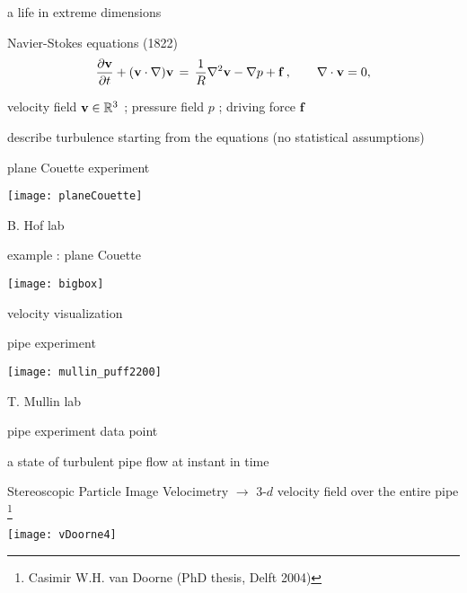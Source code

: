 \begin{frame}{a life in extreme dimensions}
\begin{block}{Navier-Stokes equations (1822)}
\[
\dfrac{\partial {\bf v}}{\partial t} + ({\bf v} \cdot \nabla) {\bf v}
	\,=\,
\frac{1}{R} \nabla ^2 {\bf v}
-\nabla p
+ \mathbf{f}
    \,,\qquad
\nabla \cdot {\bf v} = 0,
\]
\end{block}

\hfill{\small
velocity field  ${\bf v} \in \mathbb{R}^3$
;
pressure field $p$
;
driving force $\mathbf{f}$
        }

\medskip

\begin{block}{describe turbulence}
starting from the equations (no statistical assumptions)
\end{block}

\bigskip

\hfill {\Large\textcolor{red}{}}

\end{frame}

\begin{frame}{plane Couette experiment}
\begin{center}
\texttt{[image: planeCouette]}
\end{center}
B. Hof lab
\end{frame}

\begin{frame}{example : plane Couette}
\begin{center}
\texttt{[image: bigbox]}
\end{center}
velocity visualization
\end{frame}

\begin{frame}{pipe experiment}
\begin{center}
\texttt{[image: mullin\_puff2200]} %
\end{center}
T. Mullin lab
\end{frame}

\begin{frame}{pipe experiment data point}
\begin{block}{a state of turbulent pipe flow at instant in time}
\end{block}

\bigskip

Stereoscopic Particle Image Velocimetry $\to$
3-$d$ velocity field over the entire pipe%
\footnote{\footnotesize
Casimir W.H. van Doorne
(PhD thesis, Delft  2004)
}

\bigskip

\begin{center}
\texttt{[image: vDoorne4]}
\end{center}
\end{frame}


